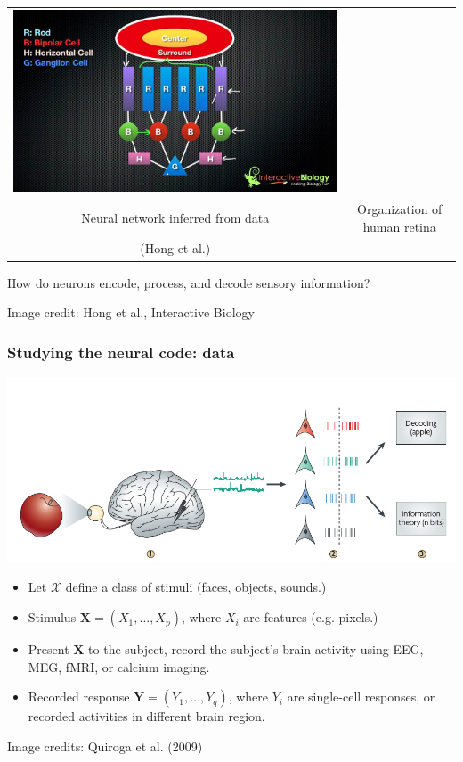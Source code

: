 \documentclass{beamer}
\newcommand{\bX}{\boldsymbol{X}}
\newcommand{\bY}{\boldsymbol{Y}}
\begin{document}
\begin{frame}
\begin{center}
\begin{tabular}{cc}
\includegraphics[scale = 0.1]{maxresdefault.jpg}\\
\small{Neural network inferred from data} & \small{Organization of human retina}\\
\small{(Hong et al.)} & 
\end{tabular}
\end{center}
\vspace{0.3in}
How do neurons encode, process, and decode sensory information?

\tiny{Image credit: Hong et al., Interactive Biology}
\end{frame}


\begin{frame}
\frametitle{Studying the neural code: data}
\begin{center}
\includegraphics[scale = 0.2]{quiroga.png}
\end{center}
\begin{itemize}
\item  Let $\mathcal{X}$ define a class of stimuli (faces, objects, sounds.)
\item Stimulus $\bX = (X_1,\hdots, X_p)$, where $X_i$ are features (e.g. pixels.)
\item Present $\bX$ to the subject, record the subject's brain activity using EEG, MEG, fMRI, or calcium imaging.
\item Recorded response $\bY = (Y_1,\hdots, Y_q)$, where $Y_i$ are single-cell responses, or recorded activities in different brain region. 
\end{itemize}
\tiny{Image credits: Quiroga et al. (2009)}
\end{frame}
\end{document}
